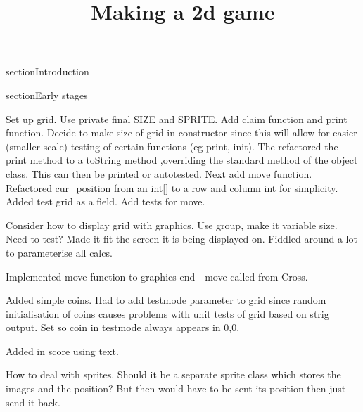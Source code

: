 \documentclass{article}
\begin{document}
\title{Making a 2d game}
\maketitle

section{Introduction}

section{Early stages}

Set up grid. Use private final SIZE and SPRITE. Add claim function and print function. Decide to make size of grid
in constructor since this will allow for easier (smaller scale) testing of certain functions (eg print, init).
The refactored the print method to a toString method ,overriding the standard method of the object class. This
can then be printed or autotested. Next add move function. Refactored cur_position from an int[] to a row and
column int for simplicity. Added test grid as a field. Add tests for move.

Consider how to display grid with graphics. Use group, make it variable size. Need to test? Made it fit the screen
it is being displayed on. Fiddled around a lot to parameterise all calcs.

Implemented move function to graphics end - move called from Cross.

Added simple coins. Had to add testmode parameter to grid since random initialisation of coins causes problems with
unit tests of grid based on strig output. Set so coin in testmode always appears in 0,0.

Added in score using text.

How to deal with sprites. Should it be a separate sprite class which stores the images and the position? But then
would have to be sent its position then just send it back. 
\end{document}
